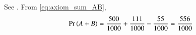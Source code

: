 \begin{table}[htb]
        \centering
        
        \caption{}
        \label{tab:11.16.3.3}
\end{table}
See 
        .
From 
\eqref{eq:axiom_sum_AB},
\begin{align}
\Pr\left(A + B\right) 
= \frac{500}{1000} + \frac{111}{1000} - \frac{55}{1000}
= \frac{556}{1000}
\end{align}


